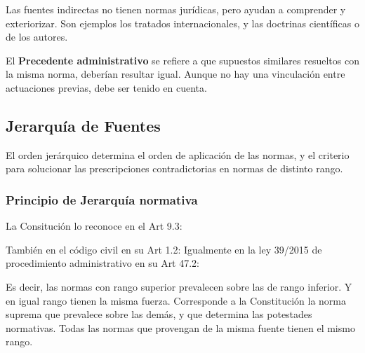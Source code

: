             Las fuentes indirectas no tienen normas jurídicas, pero ayudan a comprender y exteriorizar. Son ejemplos los tratados internacionales, y las doctrinas científicas o de los autores.

            El \textbf{Precedente administrativo} se refiere a que supuestos similares resueltos con la misma norma, deberían resultar igual. Aunque no hay una vinculación entre actuaciones previas, debe ser tenido en cuenta.

\subsection{Jerarquía de Fuentes} %
    El orden jerárquico determina el orden de aplicación de las normas, y el criterio para solucionar las prescripciones contradictorias en normas de distinto rango. 
    
    \subsubsection{Principio de Jerarquía normativa}
        La Consitución lo reconoce en el Art 9.3:
        \newline
        \noindent{}

        También en el código civil en su Art 1.2:
        \newline
        \noindent{}
        Igualmente en la ley 39/2015 de procedimiento administrativo en su Art 47.2:
        \newline
        \noindent{}

        Es decir, las normas con rango superior prevalecen sobre las de rango inferior. Y en igual rango tienen la misma fuerza. Corresponde a la Constitución la norma suprema que prevalece sobre las demás, y que determina las potestades normativas. Todas las normas que provengan de la misma fuente tienen el mismo rango.

